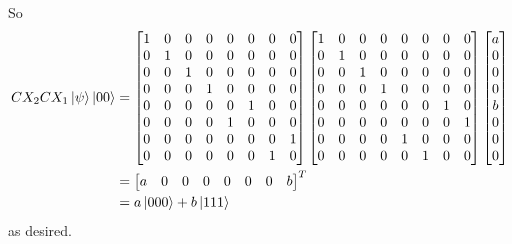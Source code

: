 So 
\begin{align*} CX_2CX_1\ket{\psi}\ket{00} &= \begin{bmatrix}1 & 0 & 0 & 0 & 0 & 0 & 0 & 0 \\ 0 & 1 & 0 & 0 & 0 & 0 & 0 & 0 \\ 0 & 0 & 1 & 0 & 0 & 0 & 0 & 0 \\ 0 & 0 & 0 & 1 & 0 & 0 & 0 & 0 \\ 0 & 0 & 0 & 0 & 0 & 1 & 0 & 0 \\ 0 & 0 & 0 & 0 & 1 & 0 & 0 & 0 \\ 0 & 0 & 0 & 0 & 0 & 0 & 0 & 1 \\ 0 & 0 & 0 & 0 & 0 & 0 & 1 & 0\end{bmatrix}\begin{bmatrix}1 & 0 & 0 & 0 & 0 & 0 & 0 & 0 \\ 0 & 1 & 0 & 0 & 0 & 0 & 0 & 0 \\ 0 & 0 & 1 & 0 & 0 & 0 & 0 & 0 \\ 0 & 0 & 0 & 1 & 0 & 0 & 0 & 0 \\ 0 & 0 & 0 & 0 & 0 & 0 & 1 & 0 \\ 0 & 0 & 0 & 0 & 0 & 0 & 0 & 1 \\ 0 & 0 & 0 & 0 & 1 & 0 & 0 & 0 \\ 0 & 0 & 0 & 0 & 0 & 1 & 0 & 0\end{bmatrix}\begin{bmatrix}a \\ 0 \\ 0 \\ 0 \\ b \\ 0 \\ 0 \\ 0\end{bmatrix} \\
&=\begin{bmatrix}a & 0 & 0 & 0 & 0 & 0 & 0 & b\end{bmatrix}^T \\ 
&= a\ket{000}+b\ket{111}
\end{align*}
as desired.